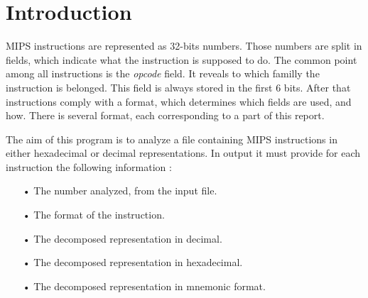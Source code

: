 \section*{Introduction}

MIPS instructions are represented as 32-bits numbers. Those numbers are split in fields, which indicate what the instruction is supposed to do. The common point among all instructions is the \textit{opcode} field. It reveals to which familly the instruction is belonged. This field is always stored in the first 6 bits. After that instructions comply with a format, which determines which fields are used, and how. There is several format, each corresponding to a part of this report.

The aim of this program is to analyze a file containing MIPS instructions in either hexadecimal or decimal representations. In output it must provide for each instruction the following information :
\begin{itemize}
\item[•] The number analyzed, from the input file.
\item[•] The format of the instruction.
\item[•] The decomposed representation in decimal.
\item[•] The decomposed representation in hexadecimal.
\item[•] The decomposed representation in mnemonic format.
\end{itemize}